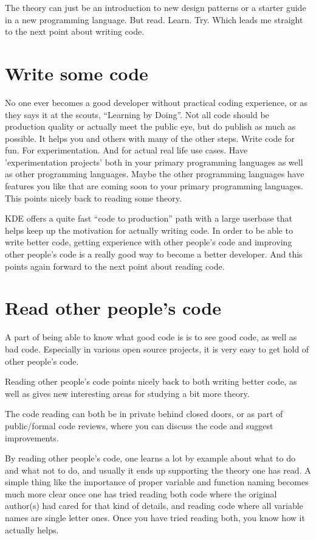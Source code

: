 The theory can just be an introduction to new design patterns or a starter guide in a new programming language. But read. Learn. Try. Which leads me straight to the next point about writing code.

\section*{Write some code}
No one ever becomes a good developer without practical coding experience, or as they says it at the scouts, “Learning by Doing”. Not all code should be production quality or actually meet the public eye, but do publish as much as possible. It helps you and others with many of the other steps. Write code for fun. For experimentation. And for actual real life use cases. Have 'experimentation projects' both in your primary programming languages as well as other programming languages. Maybe the other programming languages have features you like that are coming soon to your primary programming languages. This points nicely back to reading some theory.

KDE offers a quite fast “code to production” path with a large userbase that helps keep up the motivation for actually writing code.
In order to be able to write better code, getting experience with other people's code and improving other people's code is a really good way to become a better developer. And this points again forward to the next point about reading code.

\section*{Read other people's code}
A part of being able to know what good code is is to see good code, as well as bad code. Especially in various open source projects, it is very easy to get hold of other people's code.

Reading other people's code points nicely back to both writing better code, as well as gives new interesting areas for studying a bit more theory.

The code reading can both be in private behind closed doors, or as part of public/formal code reviews, where you can discuss the code and suggest improvements.

By reading other people's code, one learns a lot by example about what to do and what not to do, and usually it ends up supporting the theory one has read. A simple thing like the importance of proper variable and function naming becomes much more clear once one has tried reading both code where the original author(s) had cared for that kind of details, and reading code where all variable names are single letter ones. Once you have tried reading both, you know how it actually helps.

